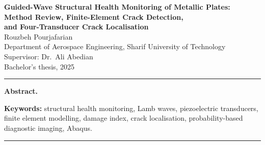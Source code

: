 \documentclass[12pt]{article}
\begin{document}

\begin{center}
{\Large\bfseries Guided-Wave Structural Health Monitoring of Metallic Plates:}\\[4pt]
{\Large\bfseries Method Review, Finite-Element Crack Detection,}\\[4pt]
{\Large\bfseries and Four-Transducer Crack Localisation}\\[16pt]
{\large Rouzbeh Pourjafarian}\\[6pt]
Department of Aerospace Engineering, Sharif University of Technology\\[2pt]
Supervisor: Dr.~Ali Abedian\\[2pt]
Bachelor's thesis, 2025
\end{center}

\begin{center}
\rule{\linewidth}{0.4pt}
\end{center}

\vspace{4pt}
\noindent\textbf{Abstract.}


\vspace{4pt}
\noindent\textbf{Keywords:} structural health monitoring, Lamb waves, piezoelectric transducers, finite element
modelling, damage index, crack localisation, probability-based diagnostic imaging, Abaqus.

\vspace{6pt}
\begin{center}
\rule{\linewidth}{0.4pt}
\end{center}

\tableofcontents
\newpage




\end{document}
